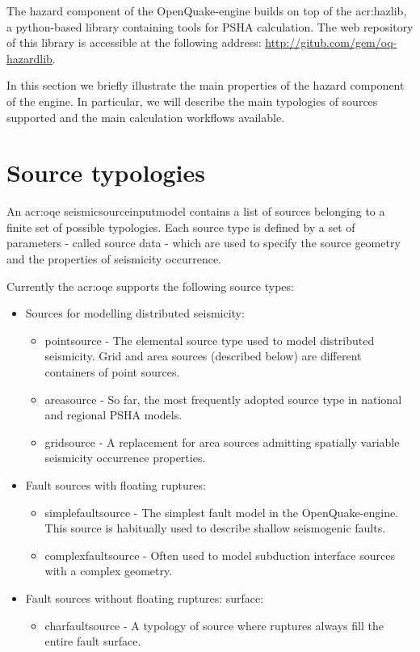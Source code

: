The hazard component of the OpenQuake-engine builds on top of the 
\gls{acr:hazlib}, a python-based library containing
tools for PSHA calculation. 
%
The web repository of this library is accessible at the following address: 
\href{http://gitub.com/gem/oq-hazardlib}{http://gitub.com/gem/oq-hazardlib}.

In this section we briefly illustrate the main properties of the 
hazard component of the engine. 
%
In particular, we will describe the main typologies of sources supported 
and the main calculation workflows available.
%
\section{Source typologies}
An \gls{acr:oqe} \gls{seismicsourceinputmodel} contains a list
of sources belonging to a finite set of possible typologies. 
Each source type is defined by a set of parameters - called 
source data - which are used to specify the source geometry and 
the properties of seismicity occurrence.
 
Currently the \gls{acr:oqe} supports the following source types: 
\begin{itemize}
	\item Sources for modelling distributed seismicity:
	\begin{itemize}
		\item \Gls{pointsource} - The elemental source type used to model 
            distributed seismicity. Grid and area sources (described below)
			are different containers of point sources.
		\item \Gls{areasource} - So far, the most frequently adopted source 
    		type in national and regional PSHA models.
		\item \Gls{gridsource} - A replacement for area sources admitting 
			spatially variable seismicity occurrence properties.
	\end{itemize}
	\item Fault sources with floating ruptures:
	\begin{itemize}
		\item \Gls{simplefaultsource} - The simplest fault model in the 
            OpenQuake-engine.
    		This source is habitually used to describe shallow seismogenic 
    		faults.
		\item \Gls{complexfaultsource} - Often used to model subduction interface 
			sources with a complex geometry. 
	\end{itemize}
	\item Fault sources without floating ruptures:
        surface:
	\begin{itemize}
		\item \Gls{charfaultsource} - A typology of source where ruptures
		always fill the entire fault surface.
	\end{itemize}
\end{itemize}

